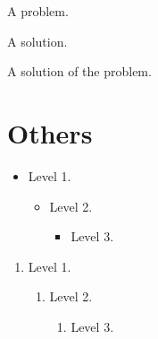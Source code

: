 \documentclass{beamer}
\begin{document}
\begin{frame}
    \begin{problem}
        A problem. \lipsum[14]
    \end{problem}
\end{frame}

\begin{frame}
    \begin{solution}
        A solution. \lipsum[15]
    \end{solution}
\end{frame}

\begin{frame}
    \begin{solution}
        A solution of the problem. \lipsum[16]
    \end{solution}
\end{frame}

\section{Others}

\begin{frame}
    \begin{itemize}
        \item Level 1.
        \begin{itemize}
            \item Level 2.
            \begin{itemize}
                \item Level 3.
            \end{itemize}
        \end{itemize}
    \end{itemize}

    \begin{enumerate}
        \item Level 1.
        \begin{enumerate}
            \item Level 2.
            \begin{enumerate}
                \item Level 3.
            \end{enumerate}
        \end{enumerate}
    \end{enumerate}
\end{frame}
\end{document}
